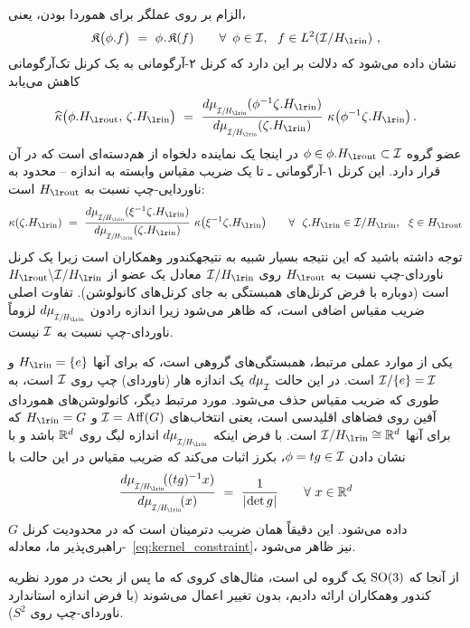 الزام بر روی عملگر برای هموردا بودن، یعنی،
\begin{align}
	\mathfrak{K}\big( \phi.f \big)\ =\ \phi \mkern1mu.\mkern1.5mu \mathfrak{K}(f)
	\qquad \forall\,\ \phi\in\I,\ \ f\in L^2(\I/\Hin) \ ,
\end{align}
نشان داده می‌شود که دلالت بر این دارد که کرنل ۲-آرگومانی به یک کرنل تک‌آرگومانی کاهش می‌یابد
\begin{align}
	\widehat{\kappa} \big(\phi.\Hout,\, \zeta.\Hin \big)
	\ =\ \frac{\dmuIHin(\phi^{-1} \zeta.\Hin)}{\dmuIHin(\zeta.\Hin)}\ \kappa\big(\phi^{-1} \zeta.\Hin \big) \,.
\end{align}
عضو گروه $\phi\in \phi.\Hout \subset \I$ در اینجا یک نماینده دلخواه از هم‌دسته‌ای است که در آن قرار دارد.
این کرنل ۱-آرگومانی ـ تا یک ضریب مقیاس وابسته به اندازه -- محدود به ناوردایی-چپ نسبت به $\Hout$ است:
\begin{align}
	\kappa(\zeta.\Hin)\ =\ \frac{\dmuIHin(\xi^{-1} \zeta.\Hin)}{\dmuIHin(\zeta.\Hin)}\ \kappa\big(\xi^{-1} \zeta.\Hin \big)
	\qquad \forall\ \ \zeta.\Hin \in \I/\Hin,\ \ \xi\in\Hout
\end{align}
توجه داشته باشید که این نتیجه بسیار شبیه به نتیجهکندور وهمکاران \cite{Kondor2018-GENERAL} است زیرا یک کرنل ناوردای-چپ نسبت به $\Hout$ روی $\I/\Hin$ معادل یک عضو از $\Hout\backslash \I/\Hin$ است (دوباره با فرض کرنل‌های همبستگی به جای کرنل‌های کانولوشن).
تفاوت اصلی ضریب مقیاس اضافی است، که ظاهر می‌شود زیرا اندازه رادون $\dmuIHin$ لزوماً ناوردای-چپ نسبت به $\mathcal{I}$ نیست.


یکی از موارد عملی مرتبط، همبستگی‌های گروهی است، که برای آنها $\Hin = \{e\}$ و $\mathcal{I}/\{e\} = \mathcal{I}$ است.
در این حالت $d\mu_{\overset{}{\mathcal{I}}}$ یک اندازه هار (ناوردای) چپ روی $\mathcal{I}$ است، به طوری که ضریب مقیاس حذف می‌شود.
مورد مرتبط دیگر، کانولوشن‌های هموردای آفين روی فضاهای اقلیدسی است، یعنی انتخاب‌های $\mathcal{I} = \operatorname{Aff}(G)$ و $\Hin=G$ که برای آنها $\I/\Hin \cong \R^d$ است.
با فرض اینکه $\dmuIHin$ اندازه لبگ روی $\mathbb{R}^d$ باشد و با نشان دادن $\phi=tg \in \mathcal{I}$، بکرز\cite{bekkers2020bspline} اثبات می‌کند که ضریب مقیاس در این حالت با
\begin{align}
	\frac{\dmuIHin\!( (tg)^{-1}x )}{\dmuIHin\!(x)}\ =\ \frac{1}{\detg} \qquad \forall\ x\in\R^d
\end{align}
داده می‌شود. این دقیقاً همان ضریب دترمینان است که در محدودیت کرنل $G$-راهبری‌پذیر ما، معادله~\eqref{eq:kernel_constraint}، نیز ظاهر می‌شود.


از آنجا که $\operatorname{SO}(3)$ یک گروه لی است، مثال‌های  کروی که ما پس از بحث در مورد نظریه کندور وهمکاران\cite{Kondor2018-GENERAL} ارائه دادیم، بدون تغییر اعمال می‌شوند (با فرض اندازه استاندارد ناوردای-چپ روی $S^2$).


